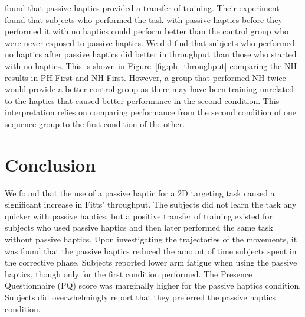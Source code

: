 \citet{insko_passive_2001} found that passive haptics provided a transfer of training.
Their experiment found that subjects who performed the task with passive haptics before they performed it with no haptics could perform better than the control group who were never exposed to passive haptics.
We did find that subjects who performed no haptics after passive haptics did better in throughput than those who started with no haptics.
This is shown in Figure~\ref{fig:ph_throughput} comparing the NH results in PH First and NH First.
However, a group that performed NH twice would provide a better control group as there may have been training unrelated to the haptics that caused better performance in the second condition.
This interpretation relies on comparing performance from the second condition of one sequence group to the first condition of the other.

\section{Conclusion}

We found that the use of a passive haptic for a 2D targeting task caused a significant increase in Fitts' throughput.
The subjects did not learn the task any quicker with passive haptics, but a positive transfer of training existed for subjects who used passive haptics and then later performed the same task without passive haptics.
Upon investigating the trajectories of the movements, it was found that the passive haptics reduced the amount of time subjects spent in the corrective phase.
Subjects reported lower arm fatigue when using the passive haptics, though only for the first condition performed.
The Presence Questionnaire (PQ) score was marginally higher for the passive haptics condition.
Subjects did overwhelmingly report that they preferred the passive haptics condition.
